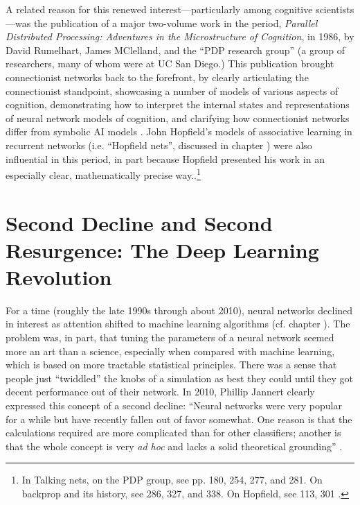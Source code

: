 A related reason for this renewed interest---particularly among cognitive scientists---was the publication of a major two-volume work in the period, {\em Parallel Distributed Processing: Adventures in the Microstructure of Cognition}, in 1986, by David Rumelhart, James MClelland, and the ``PDP research group'' (a group of researchers, many of whom were at UC San Diego.)  This publication brought connectionist networks back to the forefront, by clearly articulating the connectionist standpoint, showcasing a number of models of various aspects of cognition, demonstrating how to interpret the internal states and representations of neural network models of cognition, and clarifying how connectionist networks differ from symbolic AI models \cite{rumelhart1986parallel}. John Hopfield's models of associative learning in recurrent networks (i.e. ``Hopfield nets'', discussed in chapter ) were also influential in this period, in part because Hopfield presented his work in an especially clear, mathematically precise way.\cite{hopfield1982neural}.\footnote{In Talking nets, on the PDP group, see pp. 180, 254, 277, and 281. On  backprop and its history, see 286, 327, and 338. On Hopfield, see 113, 301 \cite{anderson2000talking}.}


\section{Second Decline and Second Resurgence: The Deep Learning Revolution}\label{deep_revolution}


For a time (roughly the late 1990s through about 2010), neural networks declined in interest as attention shifted to machine learning algorithms (cf. chapter ). The problem was, in part, that tuning the parameters of a neural network seemed more an art than a science, especially when compared with machine learning, which is based on more tractable statistical principles. There was a sense that people just ``twiddled''  the knobs of a simulation as best they could until they got decent performance out of their network. In 2010, Phillip Jannert clearly expressed this concept of a second decline: ``Neural networks were very popular for a while but have recently fallen out of favor somewhat. One reason is that the calculations required are more complicated than for other classifiers; another is that the whole concept is very \emph{ad hoc} and lacks a solid theoretical grounding'' \cite[Ch. 18]{janert2010data}.

